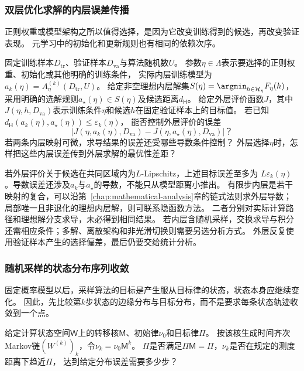 \subsubsection{双层优化求解的内层误差传播}
\label{sec:future-analysis-nested-learning}

正则权重或模型架构之所以值得选择，是因为它改变训练得到的候选，再改变验证表现。
元学习中的初始化和更新规则也有相同的依赖次序。

\begin{mathproblem}[内层求解误差对外层目标与导数的影响]
  \label{question:future-nested-learning}
  固定训练样本$D_{\mathrm{tr}}$、验证样本$D_{\mathrm{va}}$与算法随机数$U$。
  参数$\eta\in\Lambda$表示要选择的正则权重、初始化或其他明确的训练条件，
  实际内层训练模型为$a_k(\eta)=A_\eta^{(k)}(D_{\mathrm{tr}},U)$。
  给定非空理想内层解集$S(\eta)=\argmin_{h\in\mathcal H_\eta}F_\eta(h)$，
  采用明确的选解规则$a_\star(\eta)\in S(\eta)$及候选距离$d_{\mathsf H}$。
  给定外层评价函数$J$，其中$J(\eta,h,D_{\mathrm{va}})$表示训练条件$\eta$和候选$h$在固定验证样本上的目标值。
  若已知$d_{\mathsf H}(a_k(\eta),a_\star(\eta))\leq\varepsilon_k(\eta)$，
  能否控制外层评价的误差
  \[
    \left|J(\eta,a_k(\eta),D_{\mathrm{va}})
          -J(\eta,a_\star(\eta),D_{\mathrm{va}})\right|\text{？}
  \]
  若两条内层映射可微，求导结果的误差还受哪些导数条件控制？
  外层选择$\eta$时，怎样把这些内层误差传到外层求解的最优性差距？
\end{mathproblem}

若外层评价关于候选在共同区域内为$L$-Lipschitz，上述目标误差至多为
$L\varepsilon_k(\eta)$。导数误差还涉及$a_k$与$a_\star$的导数，不能只从模型距离小推出。
有限步内层是若干映射的复合，可以沿第~\ref{chap:mathematical-analysis}章的链式法则求外层导数；
局部唯一且非退化的理想内层解，则可联系隐函数方法。
二者分别对实际计算路径和理想解分支求导，未必得到相同结果。
若内层含随机采样，交换求导与积分还需相应条件；多解、离散架构和非光滑切换则需要另选分析方式。
外层反复使用验证样本产生的选择偏差，最后仍要交给统计分析。

\subsubsection{随机采样的状态分布序列收敛}
\label{sec:future-analysis-sampling-dynamics}

固定概率模型以后，采样算法的目标是产生服从目标律的状态，状态本身应继续变化。
因此，先比较第$k$步状态的边缘分布与目标分布，而不是要求每条状态轨迹收敛到一个点。

\begin{mathproblem}[采样状态分布是否趋近目标分布]
  \label{question:future-sampling-dynamics}
  给定计算状态空间$\mathsf W$上的转移核$\mathsf M$、初始律$\nu_0$和目标律$\Pi$。
  按该核生成时间齐次Markov链$(W^{(k)})_k$，令$\nu_k=\nu_0\mathsf M^k$。
  $\Pi$是否满足$\Pi\mathsf M=\Pi$，$\nu_k$是否在规定的测度距离下趋近$\Pi$，
  达到给定分布误差需要多少步？
\end{mathproblem}


